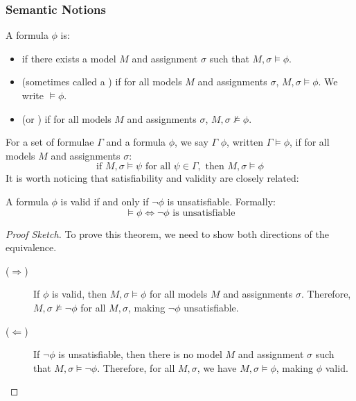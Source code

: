 \subsubsection{Semantic Notions}\label{subsubsec:semantic_notions}
A formula \(\phi\) is:
\begin{itemize}
  \item {} if there exists a model \(M\) and assignment \(\sigma\) such that \(M, \sigma \models \phi\).
  \item {} (sometimes called a ) if for all models \(M\) and assignments \(\sigma\), \(M, \sigma \models \phi\). We write \(\models \phi\).
  \item {} (or ) if for all models \(M\) and assignments \(\sigma\), \(M, \sigma \not\models \phi\).
\end{itemize}

For a set of formulae \(\Gamma\) and a formula \(\phi\), we say \(\Gamma\)  \(\phi\), written \(\Gamma \models \phi\), if for all models \(M\) and assignments \(\sigma\):
  \[\text{if } M, \sigma \models \psi \text{ for all } \psi \in \Gamma, \text{ then } M, \sigma \models \phi\]
It is worth noticing that satisfiability and validity are closely related:
\begin{theorem}\label{thm:validity_satisfiability_reduction}
A formula \(\phi\) is valid if and only if \(\neg\phi\) is unsatisfiable. Formally:
\[\models \phi \iff \neg\phi \text{ is unsatisfiable}\]
\end{theorem}

\begin{proof}[Proof Sketch]
To prove this theorem, we need to show both directions of the equivalence.
  \begin{description}
    \item[(\(\Rightarrow\))] If \(\phi\) is valid, then \(M, \sigma \models \phi\) for all models \(M\) and assignments \(\sigma\). Therefore, \(M, \sigma \not\models \neg\phi\) for all \(M, \sigma\), making \(\neg\phi\) unsatisfiable.
    \item[(\(\Leftarrow\))] If \(\neg\phi\) is unsatisfiable, then there is no model \(M\) and assignment \(\sigma\) such that \(M, \sigma \models \neg\phi\). Therefore, for all \(M, \sigma\), we have \(M, \sigma \models \phi\), making \(\phi\) valid.
  \end{description}
\end{proof}


